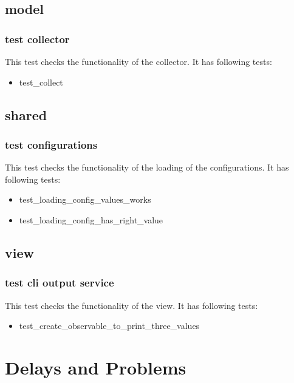 \documentclass[parskip=full]{scrartcl}
\begin{document}
\subsection{model}
\subsubsection{test collector}
This test checks the functionality of the collector.
It has following tests:

\begin{itemize}

\item test\_collect

\end{itemize}

\subsection{shared}
\subsubsection{test configurations}
This test checks the functionality of the loading of the configurations.
It has following tests:

\begin{itemize}

\item test\_loading\_config\_values\_works

\item test\_loading\_config\_has\_right\_value

\end{itemize}

\subsection{view}
\subsubsection{test cli output service}
This test checks the functionality of the view.
It has following tests:

\begin{itemize}

\item test\_create\_observable\_to\_print\_three\_values

\end{itemize}

\section{Delays and Problems}
\end{document}
